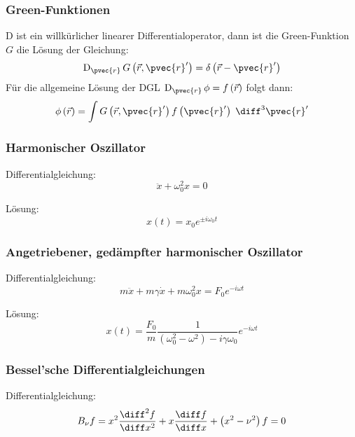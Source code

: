 \documentclass[11pt]{article}
\numberwithin{equation}{section}
\begin{document}
      \subsubsection{Green-Funktionen}
        $\mathrm{D}$ ist ein willkürlicher linearer Differentialoperator, dann ist die Green-Funktion $G$ die Lösung der Gleichung:
        \begin{equation}
          \mathrm{D}_{\pvec{r}}\, G\left(\vec{r},\pvec{r}'\right) = \delta\left(\vec{r} - \pvec{r}'\right)
        \end{equation}
        Für die allgemeine Lösung der DGL $\mathrm{D}_{\pvec{r}}\, \phi = f\left(\vec{r}\right)$ folgt dann:
        \begin{equation}
          \phi\left(\vec{r}\right) = \int G\left(\vec{r},\pvec{r}'\right)f\left(\pvec{r}'\right)\;\diff^3\pvec{r}'
        \end{equation}

      \subsubsection{Harmonischer Oszillator}
        Differentialgleichung:
        \begin{equation}
          \ddot{x}+\omega_0^2 x = 0
        \end{equation}

        Lösung:
        \begin{equation}
          x(t)=x_0 e^{\pm i\omega_0 t}
        \end{equation}

      \subsubsection{Angetriebener, gedämpfter harmonischer Oszillator}
        Differentialgleichung:
        \begin{equation}
          m\ddot{x}+m\gamma\dot{x}+m\omega_0^2 x = F_0 e^{-i\omega t}
        \end{equation}

        Lösung:
        \begin{equation}
          x(t) = \frac{F_0}{m} \frac{1}{\left(\omega_0^2-\omega^2\right)-i\gamma\omega_0} e^{-i\omega t}
        \end{equation}

      \subsubsection{Bessel'sche Differentialgleichungen}
        Differentialgleichung:
        \begin{equation}
          B_\nu f = x^2\frac{\diff^2 f}{\diff x^2} + x\tder{f}{x}+\left(x^2-\nu^2\right)f = 0
        \end{equation}
\end{document}
